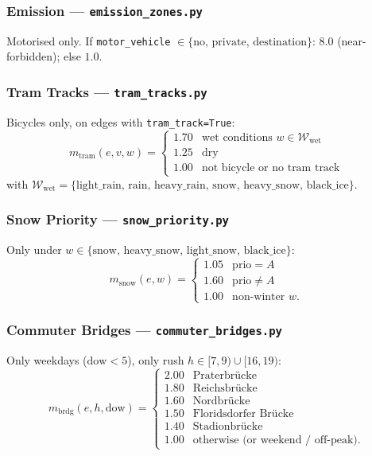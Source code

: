 \documentclass[12pt,a4paper]{article}
\begin{document}
\subsubsection{Emission — \texttt{emission\_zones.py}} Motorised only. If \texttt{motor\_vehicle} $\in\{\text{no, private, destination}\}$: $\mathbf{8.0}$ (near-forbidden); else $1.0$.

\subsubsection{Tram Tracks — \texttt{tram\_tracks.py}} Bicycles only, on edges with \texttt{tram\_track=True}:
\[
m_{\text{tram}}(e,v,w) = \begin{cases}
1.70 & \text{wet conditions } w\in\mathcal{W}_{\text{wet}} \\
1.25 & \text{dry} \\
1.00 & \text{not bicycle or no tram track}
\end{cases}
\]
with $\mathcal{W}_{\text{wet}}=\{\text{light\_rain, rain, heavy\_rain, snow, heavy\_snow, black\_ice}\}$.

\subsubsection{Snow Priority — \texttt{snow\_priority.py}} Only under $w\in\{\text{snow, heavy\_snow, light\_snow, black\_ice}\}$:
\[
m_{\text{snow}}(e,w) = \begin{cases} 1.05 & \text{prio}=A \\ 1.60 & \text{prio}\ne A \\ 1.00 & \text{non-winter }w. \end{cases}
\]

\subsubsection{Commuter Bridges — \texttt{commuter\_bridges.py}} Only weekdays ($\text{dow}<5$), only rush $h\in[7,9)\cup[16,19)$:
\[
m_{\text{brdg}}(e,h,\text{dow}) =
\begin{cases}
2.00 & \text{Praterbrücke} \\
1.80 & \text{Reichsbrücke} \\
1.60 & \text{Nordbrücke} \\
1.50 & \text{Floridsdorfer Brücke} \\
1.40 & \text{Stadionbrücke} \\
1.00 & \text{otherwise (or weekend / off-peak).}
\end{cases}
\]
\end{document}
